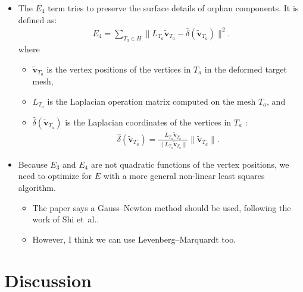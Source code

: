 \documentclass[10pt]{article}
\newcommand{\ve}[1]{\mathbf{#1}}
\newcommand{\etal}{{et~al.}}
\begin{document}
\begin{itemize}
\begin{itemize}
        \item I think this loss function is not quadratic, so we cannot optimize it by a linear solve.
    \end{itemize}

    \item The $E_4$ term tries to preserve the surface details of orphan components. It is defined as:
    \begin{align*}
        E_4 = \sum_{T_a \in H} \big\| L_{T_a} \widetilde{\ve{v}}_{T_a} - \widehat{\delta}(\widetilde{\ve{v}}_{T_a}) \big\|^2.
    \end{align*}
    where
    \begin{itemize}
        \item $\widetilde{\ve{v}}_{T_a}$ is the vertex positions of the vertices in $T_a$ in the deformed target mesh, 
        \item $L_{T_a}$ is the Laplacian operation matrix computed on the mesh $T_a$, and
        \item $\widehat{\delta}(\widetilde{\ve{v}}_{T_a})$ is the Laplacian coordinates of the vertices in $T_a$ \cite{Huang:2006:SGDMD}:
        \begin{align*}
            \widehat{\delta}(\widetilde{\ve{v}}_{T_a}) = \frac{L_{T_a} \widetilde{\ve{v}}_{T_a}}{\| L_{T_a} \widetilde{\ve{v}}_{T_a} \|} \| \widetilde{\ve{v}}_{T_a} \|.
        \end{align*}
    \end{itemize}            
    
    \item Because $E_3$ and $E_4$ are not quadratic functions of the vertex positions, we need to optimize for $E$ with a more general non-linear least squares algorithm.
    \begin{itemize}
        \item The paper says a Gauss--Newton method should be used, following the work of Shi \etal \cite{Shi:2007:MeshPuppetry}.
        
        \item However, I think we can use Levenberg--Marquardt \cite{Khungurn:NonLinearLeastSquaresAlgo} too.
    \end{itemize}
\end{itemize}

\section{Discussion}
\end{document}
